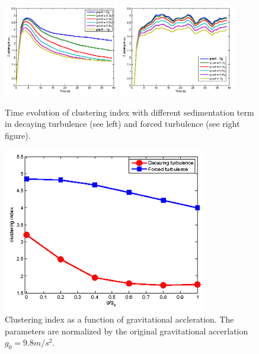 \documentclass[draft,jgrga]{AGUTeX}
\begin{document}
\begin{article}
\begin{figure}[H]\centering
\includegraphics[width=0.45\textwidth]{Figures/gravity_time_decay}
\includegraphics[width=0.45\textwidth]{Figures/gravity_time_force}
\caption{Time evolution of clustering index with different sedimentation term in decaying turbulence (see left) and 
forced turbulence (see right figure).}
\label{fig:gravity_cluster}
\end{figure}

\begin{figure}\centering
\includegraphics[width=0.8\textwidth]{Figures/sedwithgravity}
\caption{Clustering index as a function of gravitational accleration. The parameters are normalized by the original gravitational accerlation $g_0 = 9.8m/s^2$.}\label{fig:sed_gravity}
\end{figure}


\end{article}
\end{document}
